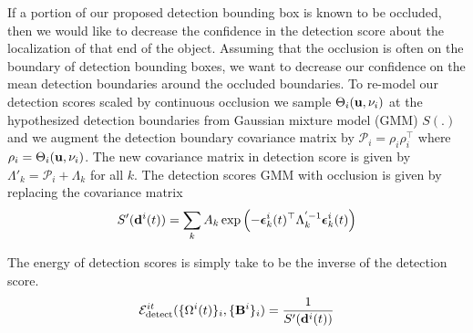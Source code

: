 If a portion of our proposed detection bounding box is known to be
occluded, then we would like to decrease the confidence in the detection score
about the localization of that end of the object. Assuming that the occlusion
is often on the boundary of detection bounding boxes, we want to decrease our
confidence on the mean detection boundaries around the occluded boundaries.
To re-model our detection scores scaled by continuous occlusion we sample
$\Theta_{i}(\mathbf{u}, \nu_i)$ at the hypothesized detection boundaries from
Gaussian mixture model (GMM) $S(.)$ and we augment the detection boundary covariance matrix by
$\mathcal{P}_{i} = \rho_{i}\rho_{i}^\top$ where $\rho_{i} = \Theta_{i}(\mathbf{u},
\nu_i)$. The new covariance matrix in detection score is given by 
  $\Lambda'_k = \mathcal{P}_{i} + \Lambda_k$ for all $k$.
The detection scores GMM with occlusion is given by replacing the covariance
matrix
%
\begin{multline}
S'(\mathbf{d}^{i}(t)) = \sum_k A_k \exp \left( -{\bm{\epsilon}}_k^{i}(t)^\top \Lambda_k^{'-1} {\bm{\epsilon}}_k^{i}(t) \right)
\end{multline}

The energy of detection scores is simply take to be the inverse of the detection score.
\begin{align}
  \mathcal{E}^{it}_{\text{detect}}(\{ \Omega^{i}(t) \}_i, \{\mathbf{B}^{i}\}_i ) = \frac{1}{S'(\mathbf{d}^{i}(t))}
\end{align}

